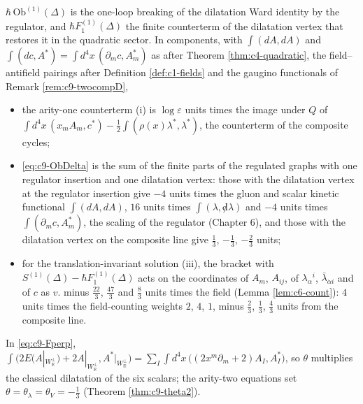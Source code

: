 \begin{remark}
$\hbar\,\mathrm{Ob}^{(1)}(\Delta)$ is the one-loop breaking of the dilatation Ward identity by the regulator, and $\hbar F_1^{(1)}(\Delta)$ the finite counterterm of the dilatation vertex that restores it in the quadratic sector. In components, with $\int(dA,dA)$ and $\int(dc,A^*)=\int d^4x\,(\partial_mc,A^*_m)$ as after Theorem \ref{thm:c4-quadratic}, the field--antifield pairings after Definition \ref{def:c1-fields} and the gaugino functionals of Remark \ref{rem:c9-twocompD},
\begin{itemize}
\item the arity-one counterterm (i) is $\log\varepsilon$ units times the image under $Q$ of $\int d^4x\,(x_mA_m,c^*)-\tfrac12\int(\rho(x)\lambda^*,\lambda^*)$, the counterterm of the composite cycles;
\item \eqref{eq:c9-ObDelta} is the sum of the finite parts of the regulated graphs with one regulator insertion and one dilatation vertex: those with the dilatation vertex at the regulator insertion give $-4$ units times the gluon and scalar kinetic functional $\int(dA,dA)$, $16$ units times $\int(\lambda,{\not d}\lambda)$ and $-4$ units times $\int(\partial_mc,A^*_m)$, the scaling of the regulator (Chapter 6), and those with the dilatation vertex on the composite line give $\tfrac13$, $-\tfrac13$, $-\tfrac23$ units;
\item for the translation-invariant solution (iii), the bracket with $S^{(1)}(\Delta)-\hbar F_1^{(1)}(\Delta)$ acts on the coordinates of $A_m$, $A_{ij}$, of $\lambda_\alpha{}^i$, $\bar\lambda_{\dot\alpha i}$ and of $c$ as $v.$ minus $\tfrac{22}3$, $\tfrac{47}3$ and $\tfrac83$ units times the field (Lemma \ref{lem:c6-count}): $4$ units times the field-counting weights $2$, $4$, $1$, minus $\tfrac23$, $\tfrac13$, $\tfrac43$ units from the composite line.
\end{itemize}
In \eqref{eq:c9-Fperp}, $\int\big(2E(A|_{W_{\mathbb R}^\perp})+2A|_{W_{\mathbb R}^\perp},A^*|_{W_{\mathbb R}^\perp}\big)=\sum_I\int d^4x\,\big((2x^m\partial_m+2)A_I,A^*_I\big)$, so $\theta$ multiplies the classical dilatation of the six scalars; the arity-two equations set $\theta=\theta_\lambda=\theta_V=-\tfrac13$ (Theorem \ref{thm:c9-theta2}).
\end{remark}

